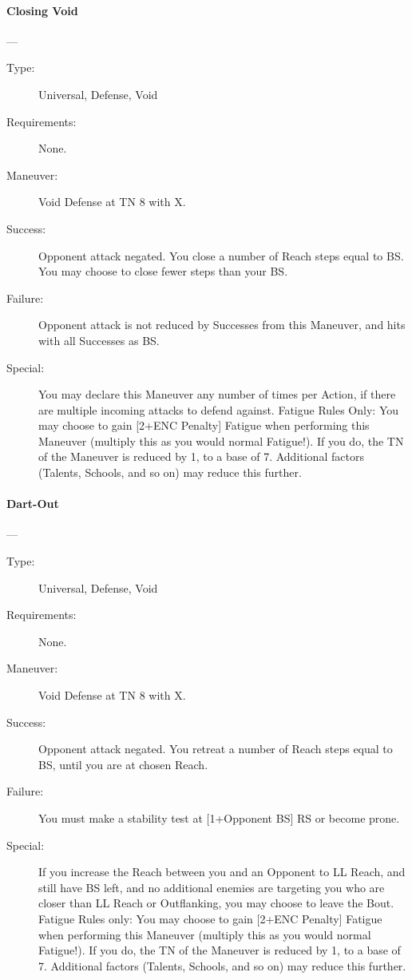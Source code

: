 \documentclass[oneside,11pt,english]{book}
\begin{document}
\paragraph{\large\label{man:Closing Void}Closing Void}---\quad{\large[X]}
\vspace{-10pt}\begin{description} 
\item [Type:] Universal, Defense, Void 
\item [Requirements:] None. 
\item [Maneuver:] Void Defense at TN 8 with X. 
\item [Success:] Opponent attack negated. You close a number of Reach steps equal to BS. You may choose to 
  close fewer steps than your BS. 
\item [Failure:] Opponent attack is not reduced by Successes from this Maneuver, and hits with all Successes as 
  BS. 
\item [Special:] You may declare this Maneuver any number of times per Action, if there are multiple incoming 
  attacks to defend against. 
  Fatigue Rules Only: You may choose to gain [2+ENC Penalty] Fatigue when performing this Maneuver 
  (multiply this as you would normal Fatigue!). If you do, the TN of the Maneuver is reduced by 1, to a 
  base of 7. Additional factors (Talents, Schools, and so on) may reduce this further. 
\end{description}
\paragraph{\large\label{man:Dart-Out}Dart-Out}---
\vspace{-10pt}\begin{description} 
\item [Type:] Universal, Defense, Void 
\item [Requirements:] None. 
\item [Maneuver:] Void Defense at TN 8 with X. 
\item [Success:] Opponent attack negated. You retreat a number of Reach steps equal to BS, until you are at 
  chosen Reach. 
\item [Failure:] You must make a stability test at [1+Opponent BS] RS or become prone. 
\item [Special:] If you increase the Reach between you and an Opponent to LL Reach, and still have BS left, and 
  no additional enemies are targeting you who are closer than LL Reach or Outflanking, you may choose to 
  leave the Bout. 
  Fatigue Rules only: You may choose to gain [2+ENC Penalty] Fatigue when performing this Maneuver 
  (multiply this as you would normal Fatigue!). If you do, the TN of the Maneuver is reduced by 1, to a 
  base of 7. Additional factors (Talents, Schools, and so on) may reduce this further. 
\end{description}
\end{document}
